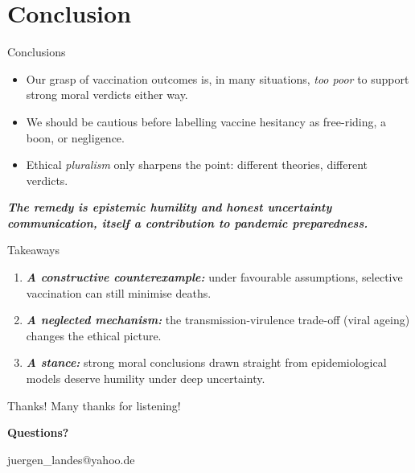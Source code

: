 \documentclass{if-beamer}
\begin{document}
\section{Conclusion}
\begin{frame}{Conclusions}
\justifying

\begin{itemize}
  \item Our grasp of vaccination outcomes is, in many situations, \emph{too poor} to support strong moral verdicts either way.
\pause

\strut

  \item We should be cautious before labelling vaccine hesitancy as free-riding, a boon, or negligence.
\pause

\strut

  \item Ethical \emph{pluralism} only sharpens the point: different theories, different verdicts.
\end{itemize}

\strut

\pause
\textbf{\textit{The remedy is epistemic humility and honest uncertainty communication, itself a contribution to pandemic preparedness.}}
\end{frame}

\begin{frame}{Takeaways}
\begin{enumerate}
\justifying
\item \textbf{\textit{A constructive counterexample:}} under favourable assumptions, selective vaccination can still minimise deaths.
\pause

\strut

\item \textbf{\textit{A neglected mechanism:}} the transmission-virulence trade-off (viral ageing) changes the ethical picture.
\pause

\strut

\item \textbf{\textit{A stance:}} strong moral conclusions drawn straight from epidemiological models deserve humility under deep uncertainty.
\end{enumerate}
\end{frame}

\begin{frame}{Thanks!}
    \centering
    \Huge
    Many thanks for listening!

\strut\strut
    \normalsize
\pause
    \textbf{Questions?}

\strut
    juergen\_landes@yahoo.de
\end{frame}
\end{document}
